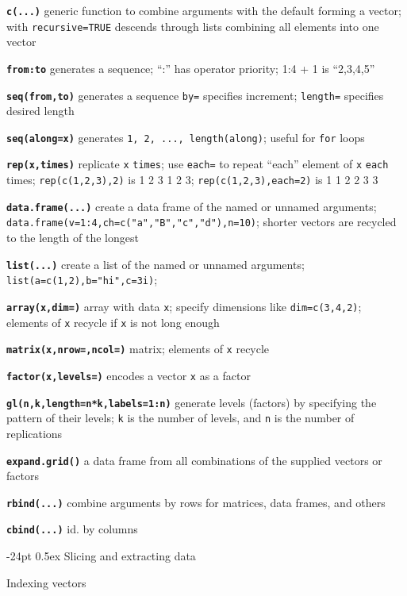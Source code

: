 \documentclass[10pt,landscape]{article}
\makeatletter
\renewcommand\section{\@startsection{section}{1}{0mm}%
                                     {-24pt}%
                                     {0.5ex}%
                                {\color{blue}\normalfont\large\bfseries}}
\newcommand{\code}{\texttt}
\newcommand{\bcode}[1]{\texttt{\textbf{#1}}}
\makeatother
\begin{document}
\begin{multicols*}{3}
\bcode{c(...)} generic function to combine arguments with the default
forming a vector;
with \code{recursive=TRUE} descends through lists combining all elements
into one vector

\bcode{from:to} generates a sequence; ``:'' has operator priority; 1:4
+ 1 is ``2,3,4,5''

\bcode{seq(from,to)} generates a sequence
\code{by=} specifies increment; \code{length=} specifies desired length

\bcode{seq(along=x)} generates \code{1, 2, ..., length(along)}; useful for
\code{for} loops

\bcode{rep(x,times)} replicate \code{x} \code{times}; use \code{each=}
to repeat ``each'' element of \code{x} \code{each} times;
\code{rep(c(1,2,3),2)} is 1 2 3 1 2 3; \code{rep(c(1,2,3),each=2)} is 1 1 2 2 3 3

\bcode{data.frame(...)} create a data frame of the named or unnamed arguments;
  \code{data.frame(v=1:4,ch=c("a","B","c","d"),n=10)}; shorter vectors
  are recycled to the length of the longest

\bcode{list(...)} create a list of the named or unnamed arguments;
  \code{list(a=c(1,2),b="hi",c=3i)};

\bcode{array(x,dim=)} array with data \code{x}; specify
dimensions like \code{dim=c(3,4,2)}; elements of \code{x} recycle if \code{x}
is not long enough

\bcode{matrix(x,nrow=,ncol=)} matrix; elements of \code{x} recycle

\bcode{factor(x,levels=)} encodes a vector \code{x} as a factor

\bcode{gl(n,k,length=n*k,labels=1:n)} generate levels (factors) by specifying
the pattern of their levels; \code{k} is the number of levels, and \code{n} is the
number of replications

\bcode{expand.grid()} a data frame from all combinations of the supplied vectors
     or factors

\bcode{rbind(...)} combine arguments by rows for matrices, data frames, and
others

\bcode{cbind(...)} id. by columns

\section{Slicing and extracting data}

Indexing vectors


\end{multicols*}
\end{document}
